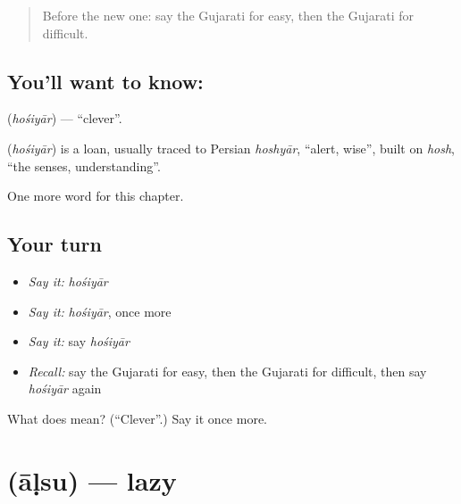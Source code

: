 \label{lesson:GU-C133-hosiyar}



\begin{quote}
Before the new one: say the Gujarati for easy, then the Gujarati for difficult.
\end{quote}

\subsection*{You'll want to know: }
\textbf{} (\emph{hośiyār}) — \textquotedblleft{}clever\textquotedblright{}.

\begin{cousinweb}
\textbf{} (\emph{hośiyār}) is a loan, usually traced to Persian \emph{hoshyār}, \textquotedblleft{}alert, wise\textquotedblright{}, built on \emph{hosh}, \textquotedblleft{}the senses, understanding\textquotedblright{}.
\end{cousinweb}

\begin{grammarlens}[title={What you've built}]
One more word for this chapter.
\end{grammarlens}

\subsection*{Your turn}
\begin{itemize}
\raggedright
  \item \emph{Say it:} \emph{hośiyār}
  \item \emph{Say it:} \emph{hośiyār}, once more
  \item \emph{Say it:} say \emph{hośiyār}
  \item \emph{Recall:} say the Gujarati for easy, then the Gujarati for difficult, then say \emph{hośiyār} again
\end{itemize}

\begin{tcolorbox}[breakable,colback=teal!4,colframe=teal!35!black,title={Before you move on}]
What does  mean? (\textquotedblleft{}Clever\textquotedblright{}.) Say it once more.
\end{tcolorbox}
\section[\texorpdfstring{\gu{આળસુ} (āḷsu)}{આળસુ (āḷsu)}]{ (āḷsu) — lazy}

